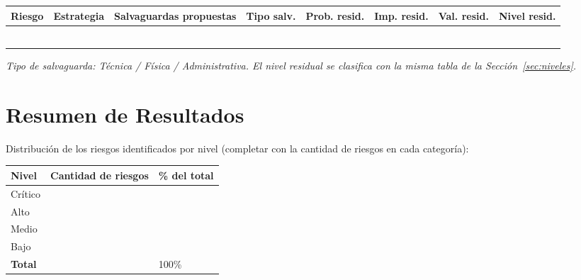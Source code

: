 \documentclass[11pt,a4paper]{article}
\begin{document}
\begin{center}
\small
\renewcommand{\arraystretch}{1.6}
\begin{tabularx}{\textwidth}{@{} >{\centering\arraybackslash}p{1.3cm} >{\raggedright\arraybackslash}p{1.7cm} X >{\raggedright\arraybackslash}p{1.7cm} >{\centering\arraybackslash}p{1cm} >{\centering\arraybackslash}p{1cm} >{\centering\arraybackslash}p{1cm} >{\centering\arraybackslash}p{1.3cm} @{}}
\toprule
\textbf{Riesgo} & \textbf{Estrategia} & \textbf{Salvaguardas propuestas} & \textbf{Tipo salv.} & \textbf{Prob. resid.} & \textbf{Imp. resid.} & \textbf{Val. resid.} & \textbf{Nivel resid.} \\
\midrule
 & & & & & & & \\
 & & & & & & & \\
 & & & & & & & \\
 & & & & & & & \\
 & & & & & & & \\
 & & & & & & & \\
\bottomrule
\end{tabularx}
\end{center}

\textit{Tipo de salvaguarda: Técnica / Física / Administrativa. El nivel residual se clasifica con la misma tabla de la Sección~\ref{sec:niveles}.}

\section{Resumen de Resultados}

Distribución de los riesgos identificados por nivel (completar con la cantidad de riesgos en cada categoría):

\begin{center}
\renewcommand{\arraystretch}{1.4}
\begin{tabularx}{0.85\textwidth}{@{} p{4cm} p{3.5cm} X @{}}
\toprule
\textbf{Nivel} & \textbf{Cantidad de riesgos} & \textbf{\% del total} \\
\midrule
\cellcolor{nivelcritico} Crítico & & \\
\cellcolor{nivelalto} Alto & & \\
\cellcolor{nivelmedio} Medio & & \\
\cellcolor{nivelbajo} Bajo & & \\
\midrule
\textbf{Total} & & 100\% \\
\bottomrule
\end{tabularx}
\end{center}
\end{document}
